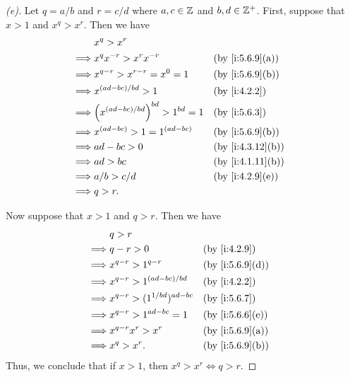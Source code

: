 \begin{proof}[(e)]
  Let \(q = a / b\) and \(r = c / d\) where \(a, c \in \mathbb{Z}\) and \(b, d \in \mathbb{Z}^+\).
  First, suppose that \(x > 1\) and \(x^q > x^r\).
  Then we have
  \begin{align*}
             & x^q > x^r                                                       \\
    \implies & x^q x^{-r} > x^r x^{-r}                   &  & \by{i:5.6.9}[a]  \\
    \implies & x^{q - r} > x^{r - r} = x^0 = 1           &  & \by{i:5.6.9}[b]  \\
    \implies & x^{(ad - bc) / bd} > 1                    &  & \by{i:4.2.2}     \\
    \implies & \pa{x^{(ad - bc) / bd}}^{bd} > 1^{bd} = 1 &  & \by{i:5.6.3}     \\
    \implies & x^{(ad - bc)} > 1 = 1^{(ad - bc)}         &  & \by{i:5.6.9}[b]  \\
    \implies & ad - bc > 0                               &  & \by{i:4.3.12}[b] \\
    \implies & ad > bc                                   &  & \by{i:4.1.11}[b] \\
    \implies & a / b > c / d                             &  & \by{i:4.2.9}[e]  \\
    \implies & q > r.
  \end{align*}

  Now suppose that \(x > 1\) and \(q > r\).
  Then we have
  \begin{align*}
             & q > r                                                   \\
    \implies & q - r > 0                          &  & \by{i:4.2.9}    \\
    \implies & x^{q - r} > 1^{q - r}              &  & \by{i:5.6.9}[d] \\
    \implies & x^{q - r} > 1^{(ad - bc) / bd}     &  & \by{i:4.2.2}    \\
    \implies & x^{q - r} > (1^{1 / bd})^{ad - bc} &  & \by{i:5.6.7}    \\
    \implies & x^{q - r} > 1^{ad - bc} = 1        &  & \by{i:5.6.6}[e] \\
    \implies & x^{q - r} x^r > x^r                &  & \by{i:5.6.9}[a] \\
    \implies & x^q > x^r.                         &  & \by{i:5.6.9}[b]
  \end{align*}
  Thus, we conclude that if \(x > 1\), then \(x^q > x^r \iff q > r\).


\end{proof}
